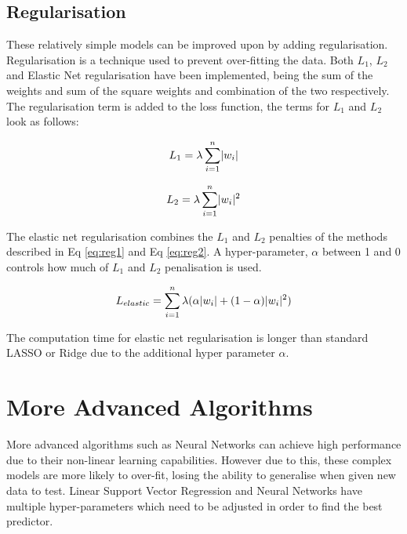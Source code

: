 \documentclass[10pt,twocolumn,letterpaper]{article}
\DeclarePairedDelimiter\abs{\lvert}{\rvert}%
\begin{document}
\subsection{Regularisation}
These relatively simple models can be improved upon by adding regularisation. Regularisation is a technique used to prevent over-fitting the data. Both $L_1$, $L_2$ and Elastic Net regularisation have been implemented, being the sum of the weights and sum of the square weights and combination of the two respectively. The regularisation term is added to the loss function, the terms for $L_1$ and $L_2$ look as follows:

\begin{center}
\noindent\begin{minipage}{.5\linewidth}
	\begin{equation}
	L_1 = \lambda \sum_{i = 1}^{n} \abs{w_i}
	\label{eq:reg1}
	\end{equation}
\end{minipage}%
\begin{minipage}{.5\linewidth}
	\begin{equation}
	L_2 = \lambda \sum_{i = 1}^{n} \abs{w_i}^2
	\label{eq:reg2}
	\end{equation}
\end{minipage}
\end{center}

The elastic net regularisation combines the $L_1$ and $L_2$ penalties of the methods described in Eq \ref{eq:reg1} and Eq \ref{eq:reg2}. A hyper-parameter, $\alpha$ between 1 and 0 controls how much of $L_1$ and $L_2$ penalisation is used.

\begin{equation}
L_{elastic} = \sum_{i = 1}^{n} \lambda (\alpha\abs{w_i} + (1-\alpha)\abs{w_i}^2)
\label{eq:elastic}
\end{equation}

The computation time for elastic net regularisation is longer than standard LASSO or Ridge due to the additional hyper parameter $\alpha$. 

\section{More Advanced Algorithms}
More advanced algorithms such as Neural Networks can achieve high performance due to their non-linear learning capabilities. However due to this, these complex models are more likely to over-fit, losing the ability to generalise when given new data to test. Linear Support Vector Regression and Neural Networks have multiple hyper-parameters which need to be adjusted in order to find the best predictor.
\end{document}

